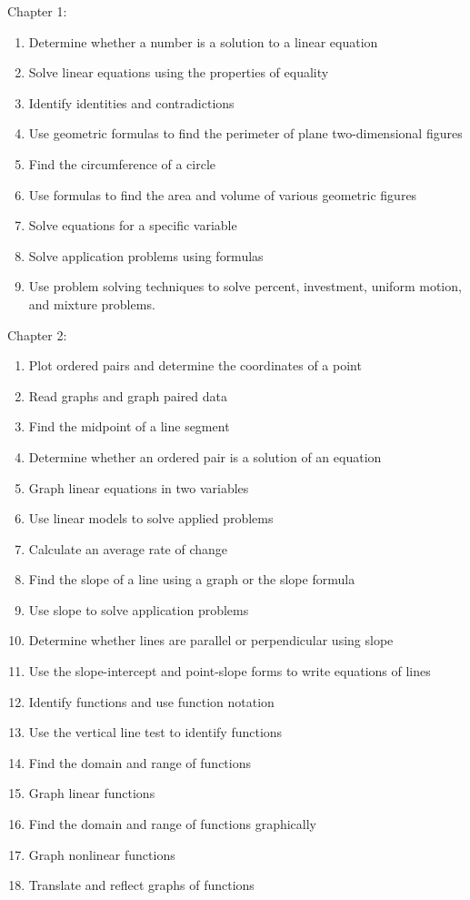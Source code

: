 \documentclass[11pt]{article}
\newenvironment{alphalist}{
  \begin{enumerate}[(1)]
    \addtolength{\itemsep}{-1.0\itemsep}}
  {\end{enumerate}}
\begin{document}
\noindent Chapter 1:
\begin{alphalist}
    \item Determine whether a number is a solution to a linear equation
    \item Solve linear equations using the properties of equality
    \item Identify identities and contradictions
    \item Use geometric formulas to find the perimeter of plane two-dimensional figures
    \item Find the circumference of a circle
    \item Use formulas to find the area and volume of various geometric figures
    \item Solve equations for a specific variable
    \item Solve application problems using formulas
    \item Use problem solving techniques to solve percent, investment, uniform motion, and mixture problems.
\end{alphalist}
\noindent Chapter 2:
\begin{alphalist}
    \item Plot ordered pairs and determine the coordinates of a point
    \item Read graphs and graph paired data
    \item Find the midpoint of a line segment
    \item Determine whether an ordered pair is a solution of an equation
    \item Graph linear equations in two variables
    \item Use linear models to solve applied problems
    \item Calculate an average rate of change
    \item Find the slope of a line using a graph or the slope formula
    \item Use slope to solve application problems
    \item Determine whether lines are parallel or perpendicular using slope
    \item Use the slope-intercept and point-slope forms to write equations of lines
    \item Identify functions and use function notation
    \item Use the vertical line test to identify functions
    \item Find the domain and range of functions
    \item Graph linear functions
    \item Find the domain and range of functions graphically
    \item Graph nonlinear functions
    \item Translate and reflect graphs of functions
\end{alphalist}
 
\end{document}
